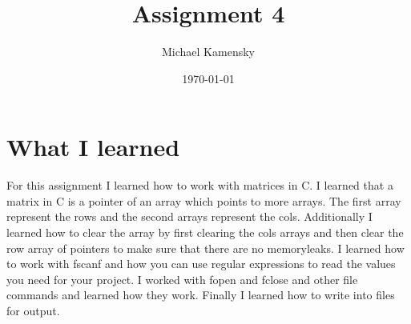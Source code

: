 \documentclass[11pt]{article} %
\title{Assignment 4}
\author{Michael Kamensky}
\date{\today} %
\begin{document}
\maketitle %
\section{What I learned}
For this assignment I learned how to work with matrices in C.
I learned that a matrix in C is a pointer of an array which points to more arrays. The first array represent the rows and the second arrays represent the cols.
Additionally I learned how to clear the array by first clearing the cols arrays and then clear the row array of pointers to make sure that there are no memoryleaks.
I learned how to work with fscanf and how you can use regular expressions to read the values you need for your project.
I worked with fopen and fclose and other file commands and learned how they work.
Finally I learned how to write into files for output.
\end{document}
